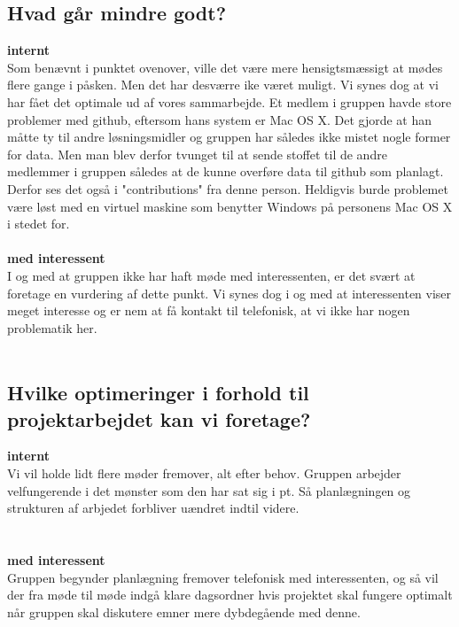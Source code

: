 \documentclass[a4paper,12pt]{article}
\begin{document}
\subsection{Hvad går mindre godt?}

\textbf{internt}
\\
Som benævnt i punktet ovenover, ville det være mere hensigtsmæssigt at mødes flere gange i påsken. Men det har desværre ike været muligt. Vi synes dog at vi har fået det optimale ud af vores sammarbejde.
Et medlem i gruppen havde store problemer med github, eftersom hans system er Mac OS X. Det gjorde at han måtte ty til andre løsningsmidler og gruppen har således ikke mistet nogle former for data. Men man blev derfor tvunget til at sende stoffet til de andre medlemmer i gruppen således at de kunne overføre data til github som planlagt. Derfor ses det også i "contributions" fra denne person. Heldigvis burde problemet være løst med en virtuel maskine som benytter Windows på personens Mac OS X i stedet for.
\\
\\
\textbf{med interessent}
\\
I og med at gruppen ikke har haft møde med interessenten, er det svært at foretage en vurdering af dette punkt. Vi synes dog i og med at interessenten viser meget interesse og er nem at få kontakt til telefonisk, at vi ikke har nogen problematik her. 
\\
\\
\subsection{Hvilke optimeringer i forhold til projektarbejdet kan vi foretage?}

\textbf{internt}
\\
Vi vil holde lidt flere møder fremover, alt efter behov. Gruppen arbejder velfungerende i det mønster som den har sat sig i pt. Så planlægningen og strukturen af arbjedet forbliver uændret indtil videre.
\\ 
\\
\\
\textbf{med interessent}
\\
Gruppen begynder planlægning fremover telefonisk med interessenten, og så vil der fra møde til møde indgå klare dagsordner hvis projektet skal fungere optimalt når gruppen skal diskutere emner mere dybdegående med denne.  
\end{document}
